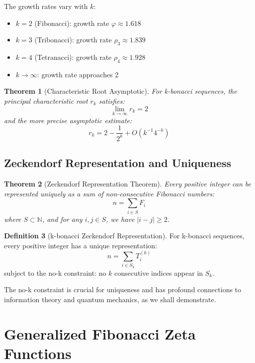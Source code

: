 \documentclass[12pt]{article}
\theoremstyle{plain}
\newtheorem{theorem}{Theorem}[section]
\theoremstyle{definition}
\newtheorem{definition}[theorem]{Definition}
\newcommand{\N}{\mathbb{N}}
\newcommand{\phi}{\varphi}
\begin{document}
The growth rates vary with $k$:
\begin{itemize}
\item $k=2$ (Fibonacci): growth rate $\phi \approx 1.618$
\item $k=3$ (Tribonacci): growth rate $\rho_3 \approx 1.839$
\item $k=4$ (Tetranacci): growth rate $\rho_4 \approx 1.928$
\item $k \to \infty$: growth rate approaches 2
\end{itemize}

\begin{theorem}[Characteristic Root Asymptotic]
For k-bonacci sequences, the principal characteristic root $r_k$ satisfies:
\begin{equation}
\lim_{k \to \infty} r_k = 2
\end{equation}
and the more precise asymptotic estimate:
\begin{equation}
r_k = 2 - \frac{1}{2^k} + O(k^{-1} 4^{-k})
\end{equation}
\end{theorem}

\subsection{Zeckendorf Representation and Uniqueness}

\begin{theorem}[Zeckendorf Representation Theorem]
Every positive integer can be represented uniquely as a sum of non-consecutive Fibonacci numbers:
\begin{equation}
n = \sum_{i \in S} F_i
\end{equation}
where $S \subset \N$, and for any $i, j \in S$, we have $|i - j| \geq 2$.
\end{theorem}

\begin{definition}[k-bonacci Zeckendorf Representation]
For k-bonacci sequences, every positive integer has a unique representation:
\begin{equation}
n = \sum_{i \in S_k} T_i^{(k)}
\end{equation}
subject to the no-k constraint: no $k$ consecutive indices appear in $S_k$.
\end{definition}

The no-k constraint is crucial for uniqueness and has profound connections to information theory and quantum mechanics, as we shall demonstrate.

\section{Generalized Fibonacci Zeta Functions}
\end{document}

